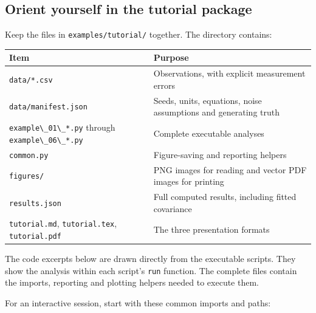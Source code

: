 \documentclass[
  british,
  10pt,
  a4paper,
]{article}
\newcommand{\passthrough}[1]{#1}
\begin{document}

\subsection{Orient yourself in the tutorial
package}\label{orient-yourself-in-the-tutorial-package}

Keep the files in \passthrough{\lstinline!examples/tutorial/!} together.
The directory contains:

\begin{longtable}[]{@{}
  >{\raggedright\arraybackslash}p{}
  >{\raggedright\arraybackslash}p{}@{}}
\toprule\noalign{}
\begin{minipage}[b]{\linewidth}\raggedright
Item
\end{minipage} & \begin{minipage}[b]{\linewidth}\raggedright
Purpose
\end{minipage} \\
\midrule\noalign{}
\endhead
\bottomrule\noalign{}
\endlastfoot
\passthrough{\lstinline!data/*.csv!} & Observations, with explicit
measurement errors \\
\passthrough{\lstinline!data/manifest.json!} & Seeds, units, equations,
noise assumptions and generating truth \\
\passthrough{\lstinline!example\_01\_*.py!} through
\passthrough{\lstinline!example\_06\_*.py!} & Complete executable
analyses \\
\passthrough{\lstinline!common.py!} & Figure-saving and reporting
helpers \\
\passthrough{\lstinline!figures/!} & PNG images for reading and vector
PDF images for printing \\
\passthrough{\lstinline!results.json!} & Full computed results,
including fitted covariance \\
\passthrough{\lstinline!tutorial.md!},
\passthrough{\lstinline!tutorial.tex!},
\passthrough{\lstinline!tutorial.pdf!} & The three presentation
formats \\
\end{longtable}

The code excerpts below are drawn directly from the executable scripts.
They show the analysis within each script's
\passthrough{\lstinline!run!} function. The complete files contain the
imports, reporting and plotting helpers needed to execute them.

For an interactive session, start with these common imports and paths:
\end{document}
